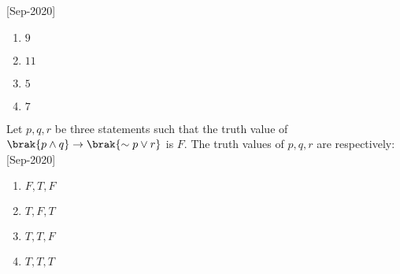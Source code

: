     \hfill{[Sep-2020]}
        \begin{enumerate}
            \item $9$
            \item $11$
            \item $5$
            \item $7$
        \end{enumerate}
    \item Let $p,q,r$ be three statements such that the truth value of $\brak{p\wedge q}\rightarrow\brak{\sim p\vee r}$ is $F$. The truth values of $p,q,r$ are respectively$\colon$
    \hfill{[Sep-2020]}
        \begin{enumerate}
            \item $F,T,F$
            \item $T,F,T$
            \item $T,T,F$
            \item $T,T,T$
        \end{enumerate}
